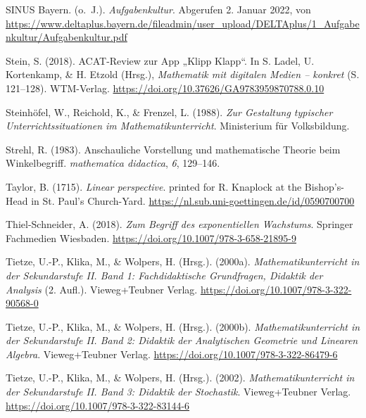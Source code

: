 \documentclass[
]{scrbook}
\newlength{\cslhangindent}
\newlength{\cslentryspacingunit} %
\newenvironment{CSLReferences}[2] %
 {%
  \setlength{\parindent}{0pt}
  \ifodd #1
  \let\oldpar\par
  \def\par{\hangindent=\cslhangindent\oldpar}
  \fi
  \setlength{\parskip}{#2\cslentryspacingunit}
 }%
 {}
\theoremstyle{definition}
\theoremstyle{definition}
\theoremstyle{definition}
\theoremstyle{definition}
\theoremstyle{remark}
\begin{document}
\begin{CSLReferences}{1}{0}
\leavevmode{}%
SINUS Bayern. (o.~J.). \emph{Aufgabenkultur}. Abgerufen 2. Januar 2022, von \url{https://www.deltaplus.bayern.de/fileadmin/user_upload/DELTAplus/1_Aufgabenkultur/Aufgabenkultur.pdf}

\leavevmode{}%
Stein, S. (2018). {ACAT}-{Review} zur {App} „{Klipp} {Klapp}``. In S. Ladel, U. Kortenkamp, \& H. Etzold (Hrsg.), \emph{Mathematik mit digitalen {Medien} -- konkret} (S. 121--128). WTM-Verlag. \url{https://doi.org/10.37626/GA9783959870788.0.10}

\leavevmode{}%
Steinhöfel, W., Reichold, K., \& Frenzel, L. (1988). \emph{Zur {Gestaltung} typischer {Unterrichtssituationen} im {Mathematikunterricht}}. Ministerium für Volksbildung.

\leavevmode{}%
Strehl, R. (1983). Anschauliche {Vorstellung} und mathematische {Theorie} beim {Winkelbegriff}. \emph{mathematica didactica}, \emph{6}, 129--146.

\leavevmode{}%
Taylor, B. (1715). \emph{Linear perspective}. printed for R. Knaplock at the Bishop's-Head in St. Paul's Church-Yard. \url{https://nl.sub.uni-goettingen.de/id/0590700700}

\leavevmode{}%
Thiel-Schneider, A. (2018). \emph{Zum {Begriff} des exponentiellen {Wachstums}}. Springer Fachmedien Wiesbaden. \url{https://doi.org/10.1007/978-3-658-21895-9}

\leavevmode{}%
Tietze, U.-P., Klika, M., \& Wolpers, H. (Hrsg.). (2000a). \emph{Mathematikunterricht in der {Sekundarstufe} {II}. {Band} 1: {Fachdidaktische} {Grundfragen}, {Didaktik} der {Analysis}} (2. Aufl.). Vieweg+Teubner Verlag. \url{https://doi.org/10.1007/978-3-322-90568-0}

\leavevmode{}%
Tietze, U.-P., Klika, M., \& Wolpers, H. (Hrsg.). (2000b). \emph{Mathematikunterricht in der {Sekundarstufe} {II}. {Band} 2: {Didaktik} der {Analytischen} {Geometrie} und {Linearen} {Algebra}}. Vieweg+Teubner Verlag. \url{https://doi.org/10.1007/978-3-322-86479-6}

\leavevmode{}%
Tietze, U.-P., Klika, M., \& Wolpers, H. (Hrsg.). (2002). \emph{Mathematikunterricht in der {Sekundarstufe} {II}. {Band} 3: {Didaktik} der {Stochastik}}. Vieweg+Teubner Verlag. \url{https://doi.org/10.1007/978-3-322-83144-6}


\end{CSLReferences}
\end{document}
